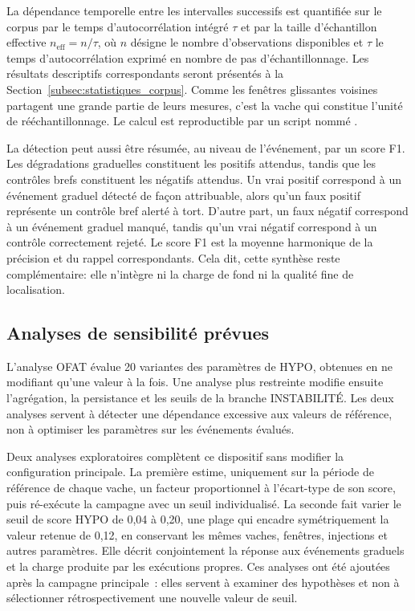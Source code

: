 La dépendance temporelle entre les intervalles successifs est quantifiée sur le corpus par le
temps d'autocorrélation intégré $\tau$ et par la taille d'échantillon effective
$n_{\text{eff}}=n/\tau$, où $n$ désigne le nombre d'observations disponibles et $\tau$ le temps
d'autocorrélation exprimé en nombre de pas d'échantillonnage. Les résultats descriptifs
correspondants seront présentés à la Section~\ref{subsec:statistiques_corpus}. Comme les fenêtres
glissantes voisines partagent une grande partie de leurs mesures, c'est la vache qui constitue
l'unité de rééchantillonnage. Le calcul est reproductible par un script nommé
.

La détection peut aussi être résumée, au niveau de l'événement, par un score F1. Les
dégradations graduelles constituent les positifs attendus, tandis que les contrôles brefs
constituent les négatifs attendus. Un vrai positif correspond à un événement graduel détecté de
façon attribuable, alors qu'un faux positif représente un contrôle bref alerté à tort. D'autre
part, un faux négatif correspond à un événement graduel manqué, tandis qu'un vrai négatif
correspond à un contrôle correctement rejeté. Le score F1 est la moyenne harmonique de la
précision et du rappel correspondants. Cela dit, cette synthèse reste complémentaire: elle
n'intègre ni la charge de fond ni la qualité fine de localisation.

\subsection{Analyses de sensibilité prévues}
L'analyse OFAT évalue
20 variantes des paramètres de HYPO, obtenues en ne modifiant qu'une valeur à la fois.
Une analyse plus restreinte modifie ensuite l'agrégation, la persistance et les seuils de la
branche INSTABILITÉ. Les deux analyses servent à détecter une dépendance excessive aux
valeurs de référence, non à optimiser les paramètres sur les événements évalués.

Deux analyses exploratoires complètent ce dispositif sans modifier la configuration
principale. La première estime, uniquement sur la période de référence de chaque vache, un facteur
proportionnel à l'écart-type de son score, puis ré-exécute la campagne avec un seuil
individualisé. La seconde fait varier le seuil de score HYPO de 0,04 à 0,20, une plage qui encadre
symétriquement la valeur retenue de 0,12, en conservant
les mêmes vaches, fenêtres, injections et autres paramètres. Elle décrit conjointement la
réponse aux événements graduels et la charge produite par les exécutions propres. Ces
analyses ont été ajoutées après la campagne principale~: elles servent à examiner des
hypothèses et non à sélectionner rétrospectivement une nouvelle valeur de seuil.

